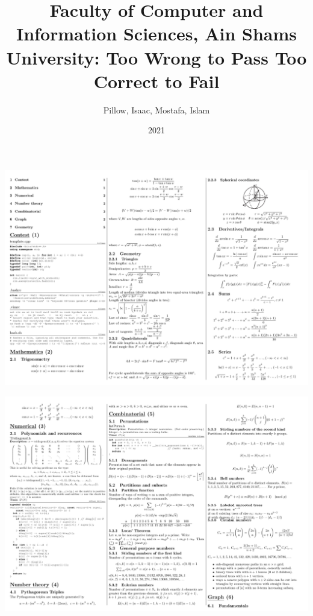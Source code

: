 \documentclass[10pt]{article}
\title{\vspace{-4ex}\Large{Faculty of Computer and Information Sciences, Ain Shams University: Too Wrong to Pass Too Correct to Fail}}
\author{Pillow, Isaac, Mostafa, Islam}
\date{2021}
\begin{document}
\begin{landscape}
\begin{multicols}{2}

\maketitle
\vspace{-13ex}
\tableofcontents
\pagestyle{fancy}



\end{multicols}
\end{landscape}

\begin{landscape}
\centerline{\includegraphics[scale=0.95]{kactl/kactl-1.pdf}}
\centerline{\includegraphics[scale=0.95]{kactl/kactl-2.pdf}}

\end{landscape}
\end{document}
